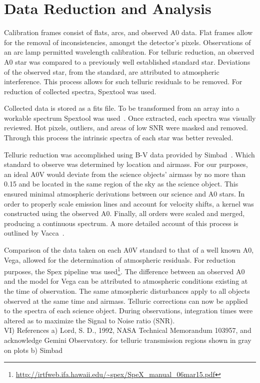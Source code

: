 \section{Data Reduction and Analysis}

Calibration frames consist of flats, arcs, and observed A0 data.  Flat frames allow for the removal of inconsistencies, amongst the detector's pixels.  Observations of an arc lamp permitted wavelength calibration.  For telluric reduction, an observed A0 star was compared to a previously well established standard star.  Deviations of the observed star, from the standard, are attributed to atmospheric interference.  This process allows for such telluric residuals to be removed.  For reduction of collected spectra, Spextool was used.





Collected data is stored as a fits file.  To be transformed from an array into a workable spectrum Spextool was used~\cite{Cushing_2004}.  Once extracted, each spectra was visually reviewed.  Hot pixels, outliers, and areas of low SNR were masked and removed.  Through this process the intrinsic spectra of each star was better revealed.


Telluric reduction was accomplished using B-V data provided by Simbad~\cite{simbad}.  Which standard to observe was determined by location and airmass.  For our purposes, an ideal A0V would deviate from the science objects' airmass by no more than 0.15 and be located in the same region of the sky as the science object.  This ensured minimal atmospheric derivations between our science and A0 stars.
In order to properly scale emission lines and account for velocity shifts, a kernel was constructed using the observed A0.  Finally, all orders were scaled and merged, producing a continuous spectrum.
A more detailed account of this process is outlined by Vacca~\cite{Vacca_2003}. 



Comparison of the data taken on each A0V standard to that of a well known A0, Vega, allowed for the determination of atmospheric residuals.  %
For reduction purposes, the Spex pipeline was used\footnote{\url{http://irtfweb.ifa.hawaii.edu/~spex/SpeX_manual_06mar15.pdf}}.  The difference between an observed A0 and the model for Vega can be attributed to atmospheric conditions existing at the time of observation.  The same atmospheric disturbances apply to all objects observed at the same time and airmass.  Telluric corrections can now be applied to the spectra of each science object.  During observations, integration times were altered as to maximize the Signal to Noise ratio (SNR). \cite{Cushing_2004}\\


VI) References
  a) Lord, S. D., 1992, NASA Technical Memorandum 103957, and acknowledge Gemini Observatory.
  for telluric transmission regions shown in gray on plots
  b) Simbad
  
  
  
  



